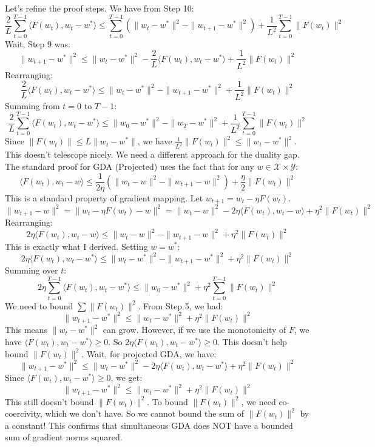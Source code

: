 \documentclass{article}
\begin{document}
Let's refine the proof steps.
We have from Step 10:
$$ \frac{2}{L} \sum_{t=0}^{T-1} \langle F(w_t), w_t - w^* \rangle \leq \sum_{t=0}^{T-1} \left( \|w_t - w^*\|^2 - \|w_{t+1} - w^*\|^2 \right) + \frac{1}{L^2} \sum_{t=0}^{T-1} \|F(w_t)\|^2 $$
Wait, Step 9 was:
$$ \|w_{t+1} - w^*\|^2 \leq \|w_t - w^*\|^2 - \frac{2}{L} \langle F(w_t), w_t - w^* \rangle + \frac{1}{L^2} \|F(w_t)\|^2 $$
Rearranging:
$$ \frac{2}{L} \langle F(w_t), w_t - w^* \rangle \leq \|w_t - w^*\|^2 - \|w_{t+1} - w^*\|^2 + \frac{1}{L^2} \|F(w_t)\|^2 $$
Summing from $t=0$ to $T-1$:
$$ \frac{2}{L} \sum_{t=0}^{T-1} \langle F(w_t), w_t - w^* \rangle \leq \|w_0 - w^*\|^2 - \|w_T - w^*\|^2 + \frac{1}{L^2} \sum_{t=0}^{T-1} \|F(w_t)\|^2 $$
Since $\|F(w_t)\| \leq L \|w_t - w^*\|$, we have $\frac{1}{L^2} \|F(w_t)\|^2 \leq \|w_t - w^*\|^2$.
This doesn't telescope nicely.
We need a different approach for the duality gap.
The standard proof for GDA (Projected) uses the fact that for any $w \in \mathcal{X} \times \mathcal{Y}$:
$$ \langle F(w_t), w_t - w \rangle \leq \frac{1}{2\eta} \left( \|w_t - w\|^2 - \|w_{t+1} - w\|^2 \right) + \frac{\eta}{2} \|F(w_t)\|^2 $$
This is a standard property of gradient mapping.
Let $w_{t+1} = w_t - \eta F(w_t)$.
$$ \|w_{t+1} - w\|^2 = \|w_t - \eta F(w_t) - w\|^2 = \|w_t - w\|^2 - 2\eta \langle F(w_t), w_t - w \rangle + \eta^2 \|F(w_t)\|^2 $$
Rearranging:
$$ 2\eta \langle F(w_t), w_t - w \rangle \leq \|w_t - w\|^2 - \|w_{t+1} - w\|^2 + \eta^2 \|F(w_t)\|^2 $$
This is exactly what I derived. Setting $w = w^*$:
$$ 2\eta \langle F(w_t), w_t - w^* \rangle \leq \|w_t - w^*\|^2 - \|w_{t+1} - w^*\|^2 + \eta^2 \|F(w_t)\|^2 $$
Summing over $t$:
$$ 2\eta \sum_{t=0}^{T-1} \langle F(w_t), w_t - w^* \rangle \leq \|w_0 - w^*\|^2 + \eta^2 \sum_{t=0}^{T-1} \|F(w_t)\|^2 $$
We need to bound $\sum \|F(w_t)\|^2$.
From Step 5, we had:
$$ \|w_{t+1} - w^*\|^2 \leq \|w_t - w^*\|^2 + \eta^2 \|F(w_t)\|^2 $$
This means $\|w_t - w^*\|^2$ can grow.
However, if we use the monotonicity of $F$, we have $\langle F(w_t), w_t - w^* \rangle \geq 0$.
So $2\eta \langle F(w_t), w_t - w^* \rangle \geq 0$.
This doesn't help bound $\|F(w_t)\|^2$.
Wait, for projected GDA, we have:
$$ \|w_{t+1} - w^*\|^2 \leq \|w_t - w^*\|^2 - 2\eta \langle F(w_t), w_t - w^* \rangle + \eta^2 \|F(w_t)\|^2 $$
Since $\langle F(w_t), w_t - w^* \rangle \geq 0$, we get:
$$ \|w_{t+1} - w^*\|^2 \leq \|w_t - w^*\|^2 + \eta^2 \|F(w_t)\|^2 $$
This still doesn't bound $\|F(w_t)\|^2$.
To bound $\|F(w_t)\|^2$, we need co-coercivity, which we don't have.
So we cannot bound the sum of $\|F(w_t)\|^2$ by a constant!
This confirms that simultaneous GDA does NOT have a bounded sum of gradient norms squared.
\end{document}
